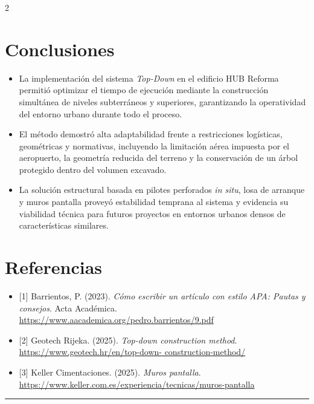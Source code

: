 \documentclass[12pt,spanish,Letterpaper,openany]{book}
\newcommand{\HRule}{\begin{center}\rule{0.5\linewidth}{0.2mm}\end{center}}
\begin{document}
\begin {multicols}{2}
\hypertarget{conclusiones-1}{%
\section{Conclusiones}\label{conclusiones-1}}

\begin{itemize}
\item
  La implementación del sistema \emph{Top-Down} en el edificio HUB Reforma permitió optimizar el tiempo de ejecución mediante la construcción simultánea de niveles subterráneos y superiores, garantizando la operatividad del entorno urbano durante todo el proceso.
\item
  El método demostró alta adaptabilidad frente a restricciones logísticas, geométricas y normativas, incluyendo la limitación aérea impuesta por el aeropuerto, la geometría reducida del terreno y la conservación de un árbol protegido dentro del volumen excavado.
\item
  La solución estructural basada en pilotes perforados \emph{in situ}, losa de arranque y muros pantalla proveyó estabilidad temprana al sistema y evidencia su viabilidad técnica para futuros proyectos en entornos urbanos densos de características similares.
\end{itemize}

\hypertarget{referencias-1}{%
\section{Referencias}\label{referencias-1}}

\begin{itemize}
\item
  {[}1{]} Barrientos, P. (2023). \emph{Cómo escribir un artículo con estilo APA: Pautas y consejos}. Acta Académica. \url{https://www.aacademica.org/pedro.barrientos/9.pdf}
\item
  {[}2{]} Geotech Rijeka. (2025). \emph{Top-down construction method}. \href{https://www.geotech.hr/en/top-down-construction-method/}{https://www.geotech.hr/en/top-down-
  construction-method/}
\item
  {[}3{]} Keller Cimentaciones. (2025). \emph{Muros pantalla}. \url{https://www.keller.com.es/experiencia/tecnicas/muros-pantalla}
\end{itemize}

\end {multicols}

\medskip

\HRule
\end{document}
